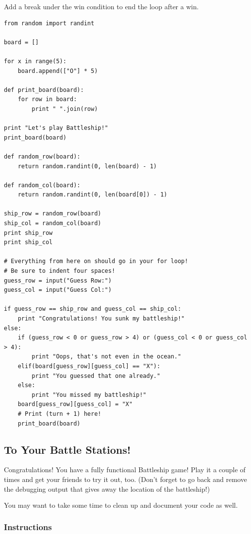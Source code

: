 \documentclass[12pt,a4paper,final,twoside,onecolumn,titlepage]{book}
\begin{document}
Add a break under the win condition to end the loop after a win.
\begin{lstlisting}
from random import randint

board = []

for x in range(5):
    board.append(["O"] * 5)

def print_board(board):
    for row in board:
        print " ".join(row)

print "Let's play Battleship!"
print_board(board)

def random_row(board):
    return random.randint(0, len(board) - 1)

def random_col(board):
    return random.randint(0, len(board[0]) - 1)

ship_row = random_row(board)
ship_col = random_col(board)
print ship_row
print ship_col

# Everything from here on should go in your for loop!
# Be sure to indent four spaces!
guess_row = input("Guess Row:")
guess_col = input("Guess Col:")

if guess_row == ship_row and guess_col == ship_col:
    print "Congratulations! You sunk my battleship!"
else:
    if (guess_row < 0 or guess_row > 4) or (guess_col < 0 or guess_col > 4):
        print "Oops, that's not even in the ocean."
    elif(board[guess_row][guess_col] == "X"):
        print "You guessed that one already."
    else:
        print "You missed my battleship!"
    board[guess_row][guess_col] = "X"
    # Print (turn + 1) here!
    print_board(board)
\end{lstlisting}

\subsection{To Your Battle Stations!}

Congratulations! You have a fully functional Battleship game! Play it a couple of times and get your friends to try it out, too. (Don’t forget to go back and remove the debugging output that gives away the location of the battleship!)

You may want to take some time to clean up and document your code as well.
\subsubsection{Instructions}
\end{document}
